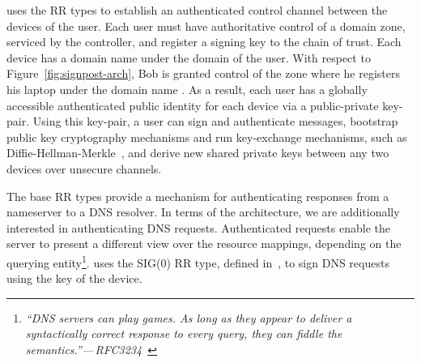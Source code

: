 \signpost uses the \dnssec RR types to establish an authenticated control
channel between the devices of the user. Each \signpost user must have
authoritative control of a domain zone, serviced by the \signpost controller,
and register a signing key to the \dnssec chain of trust. Each device has a
domain name under the domain  of the user. With respect to
Figure~\ref{fig:signpost-arch}, Bob is granted control of the zone 
where he registers his laptop under the domain name . As a
result, each \signpost user has a globally accessible authenticated public
identity for each device via a public-private key-pair. Using this key-pair, a
user can sign and authenticate messages, bootstrap public key cryptography
mechanisms and run key-exchange mechanisms, such as
Diffie-Hellman-Merkle~, and derive new shared private keys
between any two devices over unsecure channels.

The base \dnssec RR types  provide a mechanism for authenticating responses from a
nameserver to a DNS resolver. In terms of the \signpost architecture, we are
additionally interested in authenticating DNS requests. Authenticated requests
enable the server to present a different view over the resource mappings,
depending on the querying entity\footnote{{\em ``DNS servers can play games.  As
    long as they appear to deliver a syntactically correct response to every
    query, they can fiddle the semantics.''---\,RFC3234~}}.
\signpost uses the SIG(0) RR type, defined in~, to sign DNS
requests using the key of the device.  


